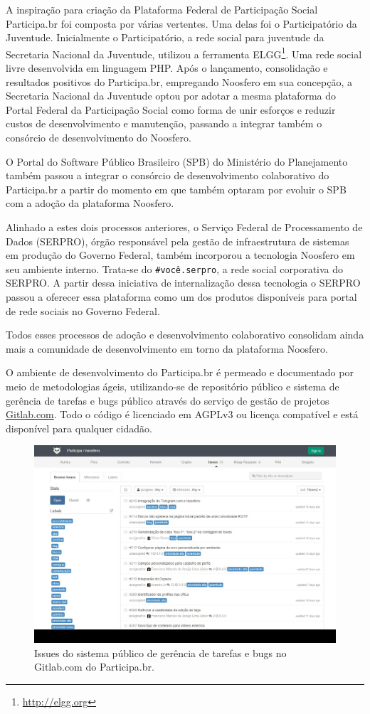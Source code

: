 \documentclass{article}
\begin{document}
A inspiração para criação da Plataforma Federal de Participação Social Participa.br foi
composta por várias vertentes. Uma delas foi o Participatório da Juventude.
Inicialmente o Participatório, a rede social para juventude da Secretaria
Nacional da Juventude, utilizou a ferramenta ELGG\footnote{\url{http://elgg.org}}. Uma rede social livre
desenvolvida em linguagem PHP. Após o lançamento, consolidação e resultados
positivos do Participa.br, empregando Noosfero em sua concepção, a Secretaria
Nacional da Juventude optou por adotar a mesma plataforma do Portal Federal da
Participação Social como forma de unir esforços e reduzir custos de
desenvolvimento e manutenção, passando a integrar também o consórcio de
desenvolvimento do Noosfero. 

O Portal do Software Público Brasileiro (SPB) do Ministério do Planejamento
também passou a integrar o consórcio de desenvolvimento colaborativo do
Participa.br a partir do momento em que também optaram por evoluir o SPB com a
adoção da plataforma Noosfero.

Alinhado a estes dois processos anteriores, o Serviço Federal de Processamento
de Dados (SERPRO), órgão responsável pela gestão de infraestrutura de sistemas
em produção do Governo Federal, também incorporou a tecnologia Noosfero em seu
ambiente interno. Trata-se do \texttt{\#você.serpro}, a rede social corporativa do
SERPRO. A partir dessa iniciativa de internalização dessa tecnologia o SERPRO
passou a oferecer essa plataforma como um dos produtos disponíveis para portal
de rede sociais no Governo Federal.

Todos esses processos de adoção e desenvolvimento colaborativo consolidam ainda
mais a comunidade de desenvolvimento em torno da plataforma Noosfero.

O ambiente de desenvolvimento do Participa.br é permeado e documentado por meio
de metodologias ágeis, utilizando-se de repositório público e sistema de
gerência de tarefas e bugs público através do serviço de gestão de projetos \url{Gitlab.com}. Todo o código é
licenciado em AGPLv3 ou licença compatível e está disponível para qualquer
cidadão.

\begin{figure}[h]
  \center
  \includegraphics[scale=0.25]{imagens/screenshot-gitlab.png}
  \caption{Issues do sistema público de gerência de tarefas e bugs no Gitlab.com do Participa.br.}
  \label{screenshot-gitlab}
\end{figure}
\end{document}
